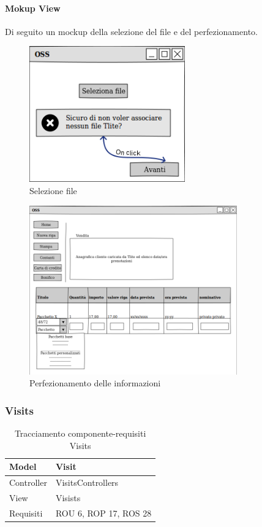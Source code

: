 \paragraph{Mokup View}
Di seguito un mockup della selezione del file e del perfezionamento.
\begin{figure}[H]
\centering
\includegraphics[width=0.6\textwidth]{images/mockup_selezione_file.png}
\caption{Selezione file}
\end{figure}

\begin{figure}[H] \label{mockupperfezionamento}
\centering
\includegraphics[width=0.8\textwidth]{images/mockup_perfezionamento_info.png}
\caption{Perfezionamento delle informazioni\label{perfezionamentoinfo}}
\end{figure}


\subsubsection{Visits}
\def\arraystretch{2}
\begin{table}[H]
\centering
\begin{tabular}{|l|l|}
\hline
Model & Visit \\ \hline
Controller & VisitsControllers \\ \hline
View & Visists \\ \hline
Requisiti & ROU 6, ROP 17, ROS 28 \\ \hline
\end{tabular}
\caption{Tracciamento componente-requisiti Visits}
\end{table}

